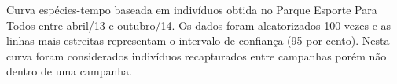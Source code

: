 \label{fig:2.1.6} Curva espécies-tempo baseada em indivíduos obtida no Parque Esporte Para Todos entre abril/13 e outubro/14. Os dados foram aleatorizados 100 vezes e as linhas mais estreitas representam o intervalo de confiança (95 por cento). Nesta curva foram considerados indivíduos recapturados entre campanhas porém não dentro de uma campanha.


